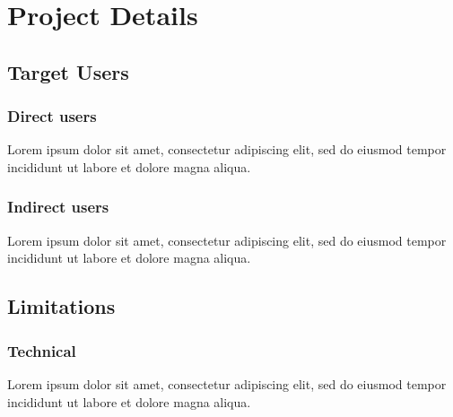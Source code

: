 \chapter{Project Details}

\section{Target Users}

\subsection{Direct users}

Lorem ipsum dolor sit amet, consectetur adipiscing elit,
sed do eiusmod tempor incididunt ut labore et dolore magna aliqua.

\subsection{Indirect users}

Lorem ipsum dolor sit amet, consectetur adipiscing elit,
sed do eiusmod tempor incididunt ut labore et dolore magna aliqua.

\section{Limitations}

\subsection{Technical}

Lorem ipsum dolor sit amet, consectetur adipiscing elit,
sed do eiusmod tempor incididunt ut labore et dolore magna aliqua.
